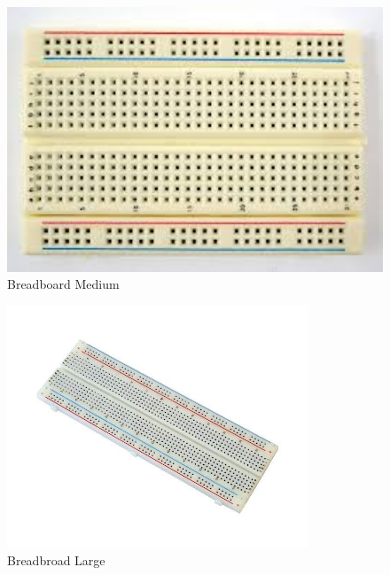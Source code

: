 \begin{enumerate}
\begin{figure}[H]
\centering
\includegraphics[width=1\textwidth]{figures/breadboard2.jpg}
\caption{Breadboard Medium}
\label{print}
\end{figure}

\begin{figure}[H]
\centering
\includegraphics[width=0.8\textwidth]{figures/3.jpg}
\caption{Breadbroad Large}
\label{print}
\end{figure}


\end{enumerate}

